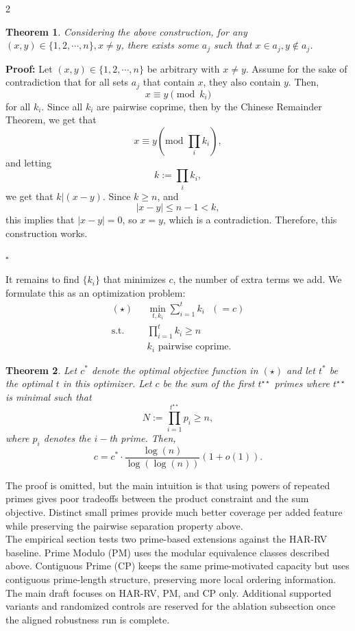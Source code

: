 ﻿\documentclass[a4paper]{article}
\newtheorem{theorem}{Theorem}
\begin{document}
\begin{multicols}{2}
\begin{theorem}
    Considering the above construction, for any $(x, y) \in \{1, 2, \cdots, n\}, x\neq y$, there exists some $a_j$ such that $x \in a_j, y \notin a_j$.
\end{theorem}
\noindent \textbf{Proof: }Let $(x, y) \in \{1, 2, \cdots, n\}$ be arbitrary with $x \neq y$. Assume for the sake of contradiction that for all sets $a_j$ that contain $x$, they also contain $y$. Then, $$x \equiv y \pmod{k_i}$$ for all $k_i$. Since all $k_i$ are pairwise coprime, then by the Chinese Remainder Theorem, we get that $$x \equiv y \left(\text{mod }\displaystyle\prod_i k_i\right),$$ and letting $$k := \displaystyle\prod_i k_i,$$we get that $k | (x-y)$. Since $k \geq n$, and $$|x-y| \leq n-1 < k,$$ this implies that $|x-y| = 0$, so $x=y$, which is a contradiction. Therefore, this construction works.
\begin{flushright}
  $\square$
\end{flushright}
\vspace{0.3cm}
\noindent It remains to find $\{k_i\}$ that minimizes $c$, the number of extra terms we add. We formulate this as an optimization problem:
\vspace{0.3cm}
\begin{align*}
    (\star) & \text{ } \min_{t, k_i} \displaystyle\sum_{i=1}^t k_i \text{ }(= c)
    \\ \text{s.t.} & \text{ }\prod_{i=1}^t k_i \geq n
    \\ &\text{ $k_i$ pairwise coprime}.
\end{align*}
\vspace{0.3cm}
\begin{theorem}
    Let $c^*$ denote the optimal objective function in $(\star)$ and let $t^*$ be the optimal $t$ in this optimizer. Let $c$ be the sum of the first $t^{\star\star}$ primes where $t^{\star\star}$ is minimal such that $$N := \displaystyle\prod_{i=1}^{t^{\star\star}} p_i \geq n,$$where $p_i$ denotes the $i-$th prime. Then, $$c = c^* \cdot \frac{\log(n)}{\log(\log(n))}(1+o(1)).$$
\end{theorem}
\vspace{0.3cm}
\noindent The proof is omitted, but the main intuition is that using powers of repeated primes gives poor tradeoffs between the product constraint and the sum objective. Distinct small primes provide much better coverage per added feature while preserving the pairwise separation property above.
\vspace{0.3cm}
\\ The empirical section tests two prime-based extensions against the HAR-RV baseline. Prime Modulo (PM) uses the modular equivalence classes described above. Contiguous Prime (CP) keeps the same prime-motivated capacity but uses contiguous prime-length structure, preserving more local ordering information. The main draft focuses on HAR-RV, PM, and CP only. Additional supported variants and randomized controls are reserved for the ablation subsection once the aligned robustness run is complete.

\end{multicols}
\end{document}
